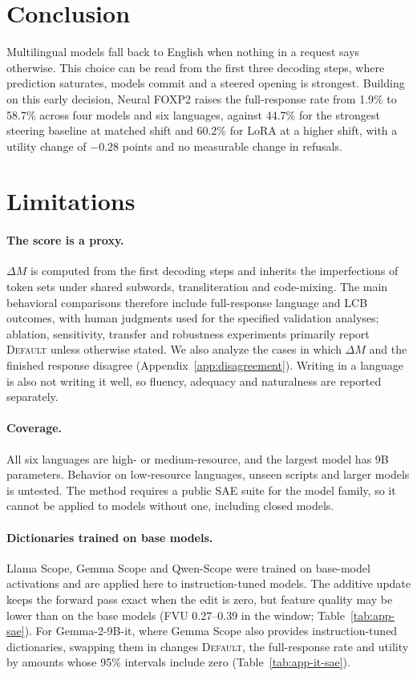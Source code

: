 \documentclass[11pt]{article}
\newcommand{\foxp}{Neural FOXP2\xspace}
\newcommand{\dM}{\ensuremath{\Delta M}\xspace}
\newcommand{\default}{\textsc{Default}\xspace}
\begin{document}
\section{Conclusion}
\label{sec:conclusion}

Multilingual models fall back to English when nothing in a request says otherwise. This choice can be read from the first three decoding steps, where prediction saturates, models commit and a steered opening is strongest. Building on this early decision, \foxp raises the full-response rate from 1.9\% to 58.7\% across four models and six languages, against 44.7\% for the strongest steering baseline at matched shift and 60.2\% for LoRA at a higher shift, with a utility change of $-0.28$ points and no measurable change in refusals.

\clearpage

\section*{Limitations}

\paragraph{The score is a proxy.}
\dM is computed from the first decoding steps and inherits the imperfections of token sets under shared subwords, transliteration and code-mixing. The main behavioral comparisons therefore include full-response language and LCB outcomes, with human judgments used for the specified validation analyses; ablation, sensitivity, transfer and robustness experiments primarily report \default unless otherwise stated. We also analyze the cases in which \dM and the finished response disagree (Appendix~\ref{app:disagreement}). Writing in a language is also not writing it well, so fluency, adequacy and naturalness are reported separately.

\paragraph{Coverage.}
All six languages are high- or medium-resource, and the largest model has 9B parameters. Behavior on low-resource languages, unseen scripts and larger models is untested. The method requires a public SAE suite for the model family, so it cannot be applied to models without one, including closed models.

\paragraph{Dictionaries trained on base models.}
Llama Scope, Gemma Scope and Qwen-Scope were trained on base-model activations and are applied here to instruction-tuned models. The additive update keeps the forward pass exact when the edit is zero, but feature quality may be lower than on the base models (FVU 0.27--0.39 in the window; Table~\ref{tab:app-sae}). For Gemma-2-9B-it, where Gemma Scope also provides instruction-tuned dictionaries, swapping them in changes \default, the full-response rate and utility by amounts whose 95\% intervals include zero (Table~\ref{tab:app-it-sae}).
\end{document}
